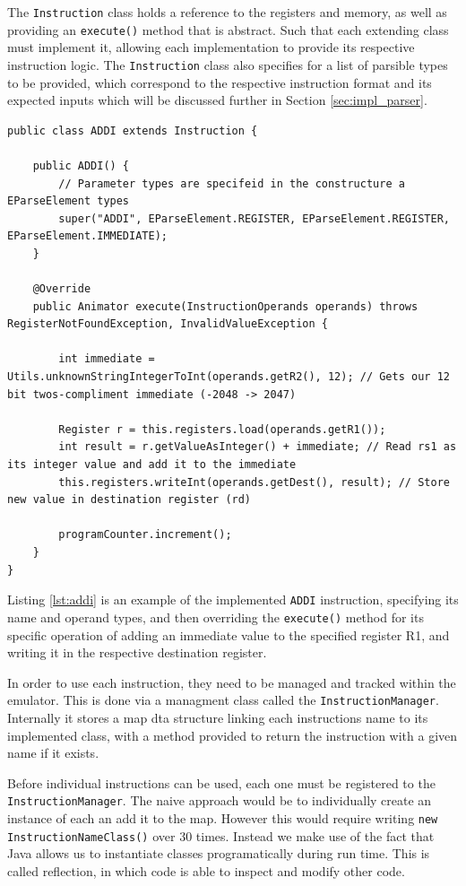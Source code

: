 The \texttt{Instruction} class holds a reference to the registers and memory, as well as providing an \texttt{execute()} method that is abstract. Such that each extending class must implement it, allowing each implementation to provide its respective instruction logic. The \texttt{Instruction} class also specifies for a list of parsible types to be provided, which correspond to the respective instruction format and its expected inputs which will be discussed further in Section \ref{sec:impl_parser}.

\begin{lstlisting}[caption=Implemented ADDI Insstruction, label=lst:addi]
public class ADDI extends Instruction {

    public ADDI() {
        // Parameter types are specifeid in the constructure a EParseElement types
        super("ADDI", EParseElement.REGISTER, EParseElement.REGISTER, EParseElement.IMMEDIATE);
    }

    @Override
    public Animator execute(InstructionOperands operands) throws RegisterNotFoundException, InvalidValueException {

        int immediate = Utils.unknownStringIntegerToInt(operands.getR2(), 12); // Gets our 12 bit twos-compliment immediate (-2048 -> 2047)

        Register r = this.registers.load(operands.getR1());
        int result = r.getValueAsInteger() + immediate; // Read rs1 as its integer value and add it to the immediate
        this.registers.writeInt(operands.getDest(), result); // Store new value in destination register (rd)
        
        programCounter.increment();
    }
}
\end{lstlisting}

Listing \ref{lst:addi} is an example of the implemented \texttt{ADDI} instruction, specifying its name and operand types, and then overriding the \verb|execute()| method for its specific operation of adding an immediate value to the specified register R1, and writing it in the respective destination register.

In order to use each instruction, they need to be managed and tracked within the emulator. This is done via a managment class called the \texttt{InstructionManager}. Internally it stores a map dta structure linking each instructions name to its implemented class, with a method provided to return the instruction with a given name if it exists.

Before individual instructions can be used, each one must be registered to the \texttt{InstructionManager}. The naive approach would be to individually create an instance of each an add it to the map. However this would require writing \verb|new InstructionNameClass()| over 30 times. Instead we make use of the fact that Java allows us to instantiate classes programatically during run time. This is called reflection, in which code is able to inspect and modify other code.


